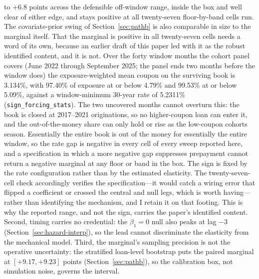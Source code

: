 \documentclass[12pt]{article}
\begin{document}
to $+6.8$ points across the defensible off-window range, inside the box and well clear of either edge, and stays positive at all twenty-seven floor-by-band cells run. The covariate-prior swing of Section~\ref{sec:pathb} is also comparable in size to the marginal itself. That the marginal is positive in all twenty-seven cells needs a word of its own, because an earlier draft of this paper led with it as the robust identified content, and it is not. Over the forty window months the cohort panel covers (June 2022 through September 2025; the panel ends two months before the window does) the exposure-weighted mean coupon on the surviving book is 3.134\%, with 97.40\% of exposure at or below 4.79\% and 99.53\% at or below 5.09\%, against a window-minimum 30-year rate of 5.2311\% (\texttt{sign\_forcing\_stats}). The two uncovered months cannot overturn this: the book is closed at 2017--2021 originations, so no higher-coupon loan can enter it, and the out-of-the-money share can only hold or rise as the low-coupon cohorts season. Essentially the entire book is out of the money for essentially the entire window, so the rate gap is negative in every cell of every sweep reported here, and a specification in which a more negative gap suppresses prepayment cannot return a negative marginal at any floor or band in the box. The sign is fixed by the rate configuration rather than by the estimated elasticity. The twenty-seven-cell check accordingly verifies the specification---it would catch a wiring error that flipped a coefficient or crossed the central and null legs, which is worth having---rather than identifying the mechanism, and I retain it on that footing. This is why the reported range, and not the sign, carries the paper's identified content. Second, timing carries no credential: the $\beta_1 = 0$ null also peaks at lag $-3$ (Section~\ref{sec:hazard-interp}), so the lead cannot discriminate the elasticity from the mechanical model. Third, the marginal's sampling precision is not the operative uncertainty: the stratified loan-level bootstrap puts the paired marginal at $[+9.17, +9.23]$ points (Section~\ref{sec:pathb}), so the calibration box, not simulation noise, governs the interval.
\end{document}
